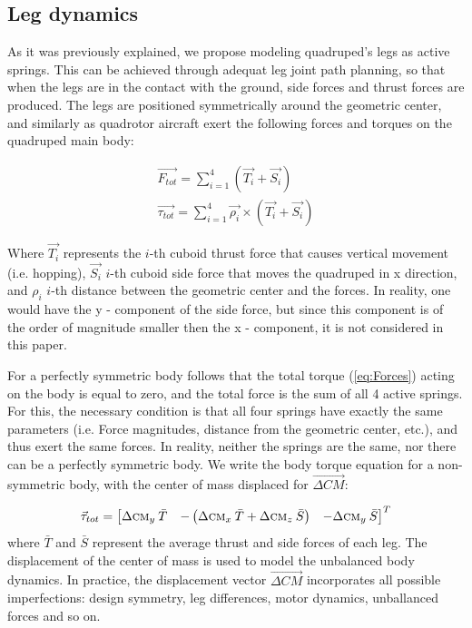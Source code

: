 \subsection{Leg dynamics}
As it was previously explained, we propose modeling quadruped's legs as active springs. This can be achieved through adequat leg joint path planning, so that when the legs are in the contact with the ground, side forces and thrust forces are produced. The legs are positioned symmetrically around the geometric center, and similarly as quadrotor aircraft exert the following forces and torques on the quadruped main body:

\begin{gather}\label{eq:Forces}
\vec{F_{tot}}=\sum_{i=1}^{4}(\vec{T_{i}}+\vec{S_{i}})\\
\vec{\tau_{tot}}=\sum_{i=1}^{4}\vec{\rho _i}\times(\vec{T_{i}}+\vec{S_{i}})
\end{gather}  

Where $\vec{T_{i}}$ represents the $i$-th cuboid thrust force that causes vertical movement (i.e. hopping), $\vec{S_{i}}$ $i$-th cuboid side force that moves the quadruped in x direction, and $\rho _i$ $i$-th distance between the geometric center and the forces. In reality, one would have the y - component of the side force, but since this component is of the order of magnitude smaller then the x - component, it is not considered in this paper.

For a perfectly symmetric body follows that the total torque (\ref{eq:Forces}) acting on the body is equal to zero, and the total force is the sum of all 4 active springs. For this, the necessary condition is that all four springs have exactly the same parameters (i.e. Force magnitudes, distance from the geometric center, etc.), and thus exert the same forces. In reality, neither the springs are the same, nor there can be a perfectly symmetric body. We write the body torque equation for a non-symmetric body, with the center of mass displaced for $\vec{\Delta CM}$:

\begin{equation}\label{eq:Torques}
\vec{\tau}_{tot}=\begin{bmatrix}
\Delta \textsc{cm}_y \:\bar{T} & -\left ( \Delta \textsc{cm}_x \:\bar{T} +\Delta \textsc{cm}_z \:\bar{S}\right ) & -\Delta \textsc{cm}_y \:\bar{S}
\end{bmatrix}^T
\end{equation}
where $\bar{T}$ and $\bar{S}$ represent the average thrust and side forces of each leg. The displacement of the center of mass is used to model the unbalanced body dynamics. In practice, the displacement vector  $\vec{\Delta CM}$ incorporates all possible imperfections: design symmetry, leg differences, motor dynamics, unballanced forces and so on.

